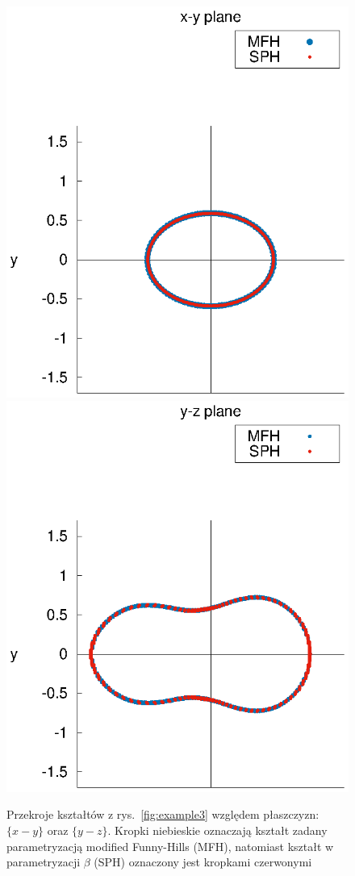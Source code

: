 \documentclass[a4paper,polish]{article}
\numberwithin{equation}{section}
\begin{document}
\begin{figure}[ht!]
	\centering
	\includegraphics[width=12cm]{xy_plane.eps}\\  
	\includegraphics[width=12cm]{yz_plane.eps}\\    
	\caption{Przekroje kształtów z rys.~\ref{fig:example3} względem płaszczyzn: $\{x-y\}$ oraz $\{y-z\}$. Kropki niebieskie oznaczają kształt zadany parametryzacją modified Funny-Hills (MFH), natomiast kształt w parametryzacji $\beta$ (SPH) oznaczony jest kropkami czerwonymi}
	\label{przekroje}%
\end{figure}
\end{document}
